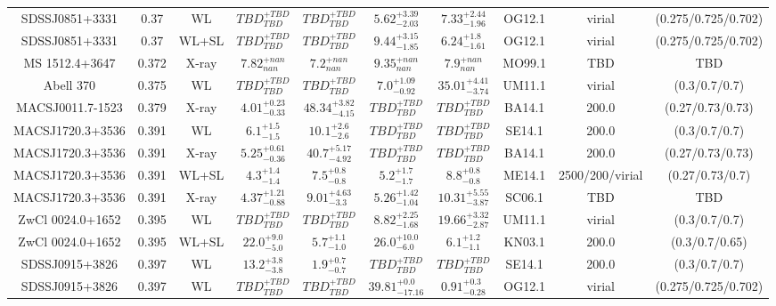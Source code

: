\begin{table}
\begin{tabular}{cccccccccc}
SDSSJ0851+3331 & 0.37 & WL & ${TBD}^{+TBD}_{TBD}$ & ${TBD}^{+TBD}_{TBD}$ & ${5.62}^{+3.39}_{-2.03}$ & ${7.33}^{+2.44}_{-1.96}$ & OG12.1 & virial & (0.275/0.725/0.702) \\
SDSSJ0851+3331 & 0.37 & WL+SL & ${TBD}^{+TBD}_{TBD}$ & ${TBD}^{+TBD}_{TBD}$ & ${9.44}^{+3.15}_{-1.85}$ & ${6.24}^{+1.8}_{-1.61}$ & OG12.1 & virial & (0.275/0.725/0.702) \\
MS 1512.4+3647 & 0.372 & X-ray & ${7.82}^{+nan}_{nan}$ & ${7.2}^{+nan}_{nan}$ & ${9.35}^{+nan}_{nan}$ & ${7.9}^{+nan}_{nan}$ & MO99.1 & TBD & TBD \\
Abell 370 & 0.375 & WL & ${TBD}^{+TBD}_{TBD}$ & ${TBD}^{+TBD}_{TBD}$ & ${7.0}^{+1.09}_{-0.92}$ & ${35.01}^{+4.41}_{-3.74}$ & UM11.1 & virial & (0.3/0.7/0.7) \\
MACSJ0011.7-1523 & 0.379 & X-ray & ${4.01}^{+0.23}_{-0.33}$ & ${48.34}^{+3.82}_{-4.15}$ & ${TBD}^{+TBD}_{TBD}$ & ${TBD}^{+TBD}_{TBD}$ & BA14.1 & 200.0 & (0.27/0.73/0.73) \\
MACSJ1720.3+3536 & 0.391 & WL & ${6.1}^{+1.5}_{-1.5}$ & ${10.1}^{+2.6}_{-2.6}$ & ${TBD}^{+TBD}_{TBD}$ & ${TBD}^{+TBD}_{TBD}$ & SE14.1 & 200.0 & (0.3/0.7/0.7) \\
MACSJ1720.3+3536 & 0.391 & X-ray & ${5.25}^{+0.61}_{-0.36}$ & ${40.7}^{+5.17}_{-4.92}$ & ${TBD}^{+TBD}_{TBD}$ & ${TBD}^{+TBD}_{TBD}$ & BA14.1 & 200.0 & (0.27/0.73/0.73) \\
MACSJ1720.3+3536 & 0.391 & WL+SL & ${4.3}^{+1.4}_{-1.4}$ & ${7.5}^{+0.8}_{-0.8}$ & ${5.2}^{+1.7}_{-1.7}$ & ${8.8}^{+0.8}_{-0.8}$ & ME14.1 & 2500/200/virial & (0.27/0.73/0.7) \\
MACSJ1720.3+3536 & 0.391 & X-ray & ${4.37}^{+1.21}_{-0.88}$ & ${9.01}^{+4.63}_{-3.3}$ & ${5.26}^{+1.42}_{-1.04}$ & ${10.31}^{+5.55}_{-3.87}$ & SC06.1 & TBD & TBD \\
ZwCl 0024.0+1652 & 0.395 & WL & ${TBD}^{+TBD}_{TBD}$ & ${TBD}^{+TBD}_{TBD}$ & ${8.82}^{+2.25}_{-1.68}$ & ${19.66}^{+3.32}_{-2.87}$ & UM11.1 & virial & (0.3/0.7/0.7) \\
ZwCl 0024.0+1652 & 0.395 & WL+SL & ${22.0}^{+9.0}_{-5.0}$ & ${5.7}^{+1.1}_{-1.0}$ & ${26.0}^{+10.0}_{-6.0}$ & ${6.1}^{+1.2}_{-1.1}$ & KN03.1 & 200.0 & (0.3/0.7/0.65) \\
SDSSJ0915+3826 & 0.397 & WL & ${13.2}^{+3.8}_{-3.8}$ & ${1.9}^{+0.7}_{-0.7}$ & ${TBD}^{+TBD}_{TBD}$ & ${TBD}^{+TBD}_{TBD}$ & SE14.1 & 200.0 & (0.3/0.7/0.7) \\
SDSSJ0915+3826 & 0.397 & WL & ${TBD}^{+TBD}_{TBD}$ & ${TBD}^{+TBD}_{TBD}$ & ${39.81}^{+0.0}_{-17.16}$ & ${0.91}^{+0.3}_{-0.28}$ & OG12.1 & virial & (0.275/0.725/0.702) \\

\end{tabular}
\end{table}
